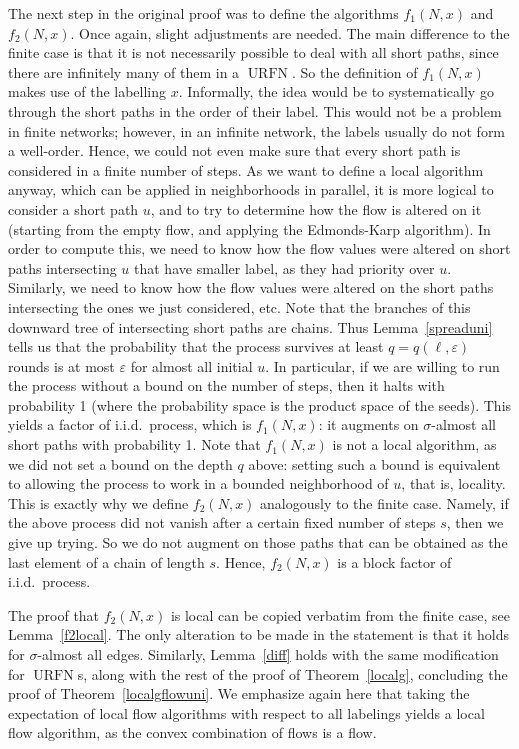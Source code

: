 \documentclass[12pt,a4paper]{article}
\newcommand{\eps}{\varepsilon}
\renewcommand{\:}{\colon}
\DeclareMathOperator{\URN}{URFN}
\begin{document}
The next step in the original proof was to define the algorithms $f_1(N,x)$ and $f_2(N,x)$. 
Once again, slight adjustments are needed. 
The main difference to the finite case is that it is not necessarily possible to deal with all short paths, since there are infinitely many of them in a $\URN$. 
So the definition of $f_1(N,x)$ makes use of the labelling $x$. 
Informally, the idea would be to systematically go through the short paths in the order of their label. 
This would not be a problem in finite networks; however, in an infinite network, the labels usually do not form a well-order. 
Hence, we could not even make sure that every short path is considered in a finite number of steps. 
As we want to define a local algorithm anyway, which can be applied in neighborhoods in parallel, it is more logical to consider a short path $u$, and to try to determine how the flow is altered on it (starting from the empty flow, and applying the Edmonds-Karp algorithm). 
In order to compute this, we need to know how the flow values were altered on short paths intersecting $u$ that have smaller label, as they had priority over $u$. 
Similarly, we need to know how the flow values were altered on the short paths intersecting the ones we just considered, etc. 
Note that the branches of this downward tree of intersecting short paths are chains. 
Thus Lemma~\ref{spreaduni} tells us that the probability that the process survives at least $q=q(\ell, \eps)$ rounds is at most $\eps$ for almost all initial $u$. 
In particular, if we are willing to run the process without a bound on the number of steps, then it halts with probability 1 (where the probability space is the product space of the seeds). 
This yields a factor of i.i.d.\ process, which is $f_1(N,x)$: it augments on $\sigma$-almost all short paths with probability 1. 
Note that $f_1(N,x)$ is not a local algorithm, as we did not set a bound on the depth $q$ above: setting such a bound is equivalent to allowing the process to work in a bounded neighborhood of $u$, that is, locality. 
This is exactly why we define $f_2(N,x)$ analogously to the finite case. 
Namely, if the above process did not vanish after a certain fixed number of steps $s$, then we give up trying. 
So we do not augment on those paths that can be obtained as the last element of a chain of length $s$. 
Hence, $f_2(N,x)$ is a block factor of i.i.d.\ process. 

The proof that $f_2(N,x)$ is local can be copied verbatim from the finite case, see Lemma~\ref{f2local}. 
The only alteration to be made in the statement is that it holds for $\sigma$-almost all edges. 
Similarly, Lemma~\ref{diff} holds with the same modification for $\URN$s, along with the rest of the proof of Theorem~\ref{localg}, concluding the proof of Theorem~\ref{localgflowuni}. 
We emphasize again here that taking the expectation of local flow algorithms with respect to all labelings yields a local flow algorithm, as the convex combination of flows is a flow. 
\end{document}
